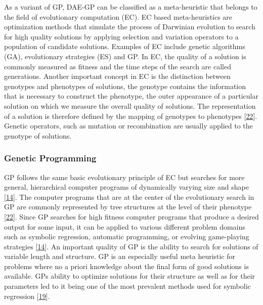 \documentclass[
  11pt,
]{article}
\begin{document}
As a variant of GP, DAE-GP can be classified as a meta-heuristic that belongs to the field of evolutionary computation (EC).
EC based meta-heuristics are optimization methods that simulate the process of Darwinian evolution to search for high quality solutions by applying selection and variation operators to a population of candidate solutions.
Examples of EC include genetic algorithms (GA), evolutionary strategies (ES) and GP.
In EC, the quality of a solution is commonly measured as fitness and the time steps of the search are called generations.
Another important concept in EC is the distinction between genotypes and phenotypes of solutions, the genotype contains the information that is necessary to construct the phenotype, the outer appearance of a particular solution on which we measure the overall quality of solutions.
The representation of a solution is therefore defined by the mapping of genotypes to phenotypes {[}\protect\hyperlink{ref-design_of_modern_heuristics}{22}{]}.
Genetic operators, such as mutation or recombination are usually applied to the genotype of solutions.

\hypertarget{genetic-programming}{%
\subsubsection{Genetic Programming}\label{genetic-programming}}

GP follows the same basic evolutionary principle of EC but searches for more general, hierarchical computer programs of dynamically varying size and shape {[}\protect\hyperlink{ref-Koza1993GeneticP}{14}{]}.
The computer programs that are at the center of the evolutionary search in GP are commonly represented by tree structures at the level of their phenotype {[}\protect\hyperlink{ref-design_of_modern_heuristics}{22}{]}.
Since GP searches for high fitness computer programs that produce a desired output for some input, it can be applied to various different problem domains such as symbolic regression, automatic programming, or evolving game-playing strategies {[}\protect\hyperlink{ref-Koza1993GeneticP}{14}{]}.
An important quality of GP is the ability to search for solutions of variable length and structure.
GP is an especially useful meta heuristic for problems where no a priori knowledge about the final form of good solutions is available.
GPs ability to optimize solutions for their structure as well as for their parameters led to it being one of the most prevalent methods used for symbolic regression {[}\protect\hyperlink{ref-10.1007ux2f978-3-540-24621-3_22}{19}{]}.
\end{document}
